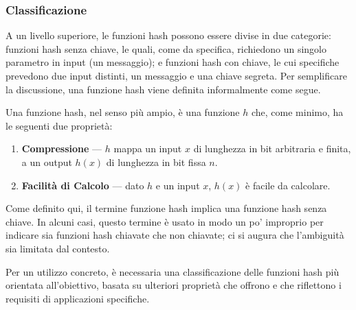 \documentclass{article}
\theoremstyle{definition}
\begin{document}
\subsubsection{Classificazione}
A un livello superiore, le funzioni hash possono essere divise in due categorie: funzioni hash senza chiave, le quali, come da specifica, richiedono un singolo parametro in input (un messaggio); e funzioni hash con chiave, le cui specifiche prevedono due input distinti, un messaggio e una chiave segreta. Per semplificare la discussione, una funzione hash viene definita informalmente come segue.

Una funzione hash, nel senso più ampio, è una funzione \( h \) che, come minimo, ha le seguenti due proprietà:
\begin{enumerate}
    \item \textbf{Compressione} --- \( h \) mappa un input \( x \) di lunghezza in bit arbitraria e finita, a un output \( h(x) \) di lunghezza in bit fissa \( n \).
    \item \textbf{Facilità di Calcolo} --- dato \( h \) e un input \( x \), \( h(x) \) è facile da calcolare.
\end{enumerate}

Come definito qui, il termine funzione hash implica una funzione hash senza chiave. In alcuni casi, questo termine è usato in modo un po' improprio per indicare sia funzioni hash chiavate che non chiavate; ci si augura che l'ambiguità sia limitata dal contesto.

Per un utilizzo concreto, è necessaria una classificazione delle funzioni hash più orientata all'obiettivo, basata su ulteriori proprietà che offrono e che riflettono i requisiti di applicazioni specifiche. 
\end{document}

